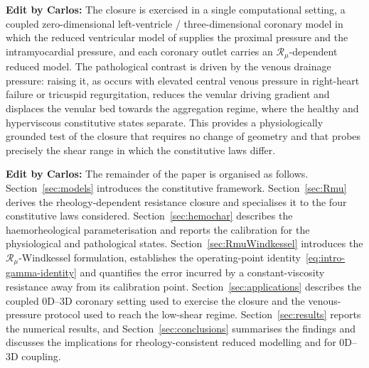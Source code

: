 \documentclass[lineno]{jfm}
\newcommand{\cbp}[1]{{\color{blue} \textbf{Edit by Carlos:} #1}}
\begin{document}
\cbp{The closure is exercised in a single computational setting, a coupled
zero-dimensional left-ventricle / three-dimensional coronary model in which the
reduced ventricular model of \citet{caruel2014dimensional} supplies the proximal
pressure and the intramyocardial pressure, and each coronary outlet carries an
$\mathcal{R}_{\mu}$-dependent reduced model. The pathological contrast is driven
by the venous drainage pressure: raising it, as occurs with elevated central
venous pressure in right-heart failure or tricuspid regurgitation, reduces the
venular driving gradient and displaces the venular bed towards the aggregation
regime, where the healthy and hyperviscous constitutive states separate. This
provides a physiologically grounded test of the closure that requires no change
of geometry and that probes precisely the shear range in which the constitutive
laws differ.}

\cbp{The remainder of the paper is organised as follows. Section~\ref{sec:models}
introduces the constitutive framework. Section~\ref{sec:Rmu} derives the
rheology-dependent resistance closure and specialises it to the four constitutive
laws considered. Section~\ref{sec:hemochar} describes the haemorheological
parameterisation and reports the calibration for the physiological and
pathological states. Section~\ref{sec:RmuWindkessel} introduces the
$\mathcal{R}_{\mu}$-Windkessel formulation, establishes the operating-point
identity~\eqref{eq:intro-gamma-identity} and quantifies the error incurred by a
constant-viscosity resistance away from its calibration point.
Section~\ref{sec:applications} describes the coupled 0D--3D coronary setting used
to exercise the closure and the venous-pressure protocol used to reach the
low-shear regime. Section~\ref{sec:results} reports the numerical results, and
Section~\ref{sec:conclusions} summarises the findings and discusses the
implications for rheology-consistent reduced modelling and for 0D--3D coupling.}
\end{document}
